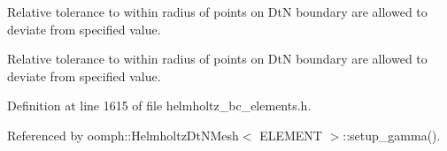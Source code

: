 Relative tolerance to within radius of points on DtN boundary are allowed to deviate from specified value. 

Relative tolerance to within radius of points on DtN boundary are allowed to deviate from specified value. 

Definition at line 1615 of file helmholtz\+\_\+bc\+\_\+elements.\+h.



Referenced by oomph\+::\+Helmholtz\+Dt\+N\+Mesh$<$ E\+L\+E\+M\+E\+N\+T $>$\+::setup\+\_\+gamma().

